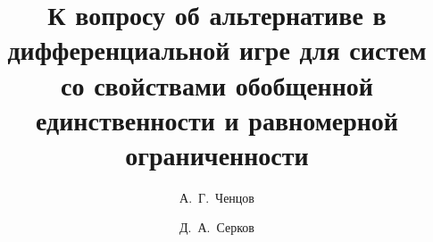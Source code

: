 

\usepackage{todonotes} %

\usepackage[russian]{nla}

%
%


%



\fi
%

\title{К вопросу об альтернативе в дифференциальной игре для систем со свойствами обобщенной единственности и равномерной ограниченности}%
\author{А.~Г.~Ченцов   \and  Д.~А.~Серков 
} %


\maketitle

